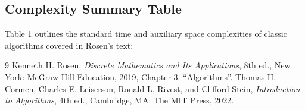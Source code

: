 \documentclass[11pt,a4paper]{article}
\begin{document}
\subsection{Complexity Summary Table}
Table 1 outlines the standard time and auxiliary space complexities of classic algorithms covered in Rosen's text:

\begin{table}[htbp]
    \centering
    \caption{Comparative Time and Space Complexities}
    \label{tab:complexity}
\end{table}

\begin{thebibliography}{9}
Kenneth H. Rosen, \emph{Discrete Mathematics and Its Applications}, 8th ed., New York: McGraw-Hill Education, 2019, Chapter 3: ``Algorithms''.
Thomas H. Cormen, Charles E. Leiserson, Ronald L. Rivest, and Clifford Stein, \emph{Introduction to Algorithms}, 4th ed., Cambridge, MA: The MIT Press, 2022.
\end{thebibliography}
\end{document}
